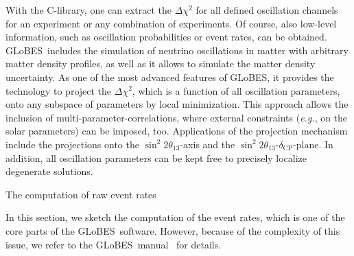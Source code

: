 \documentclass[12pt,a4paper]{article}
\makeatletter
\renewcommand{\section}{\@startsection{section}{1}{0em}{-\baselineskip}%
{\baselineskip}{\normalfont\large\bfseries}}
\newcommand{\eg}{{\it e.g.}}
\newcommand{\deltacp}{\delta_{\mathrm{CP}}}
\newcommand{\stheta}{\sin^2 2 \theta_{13}}
\newcommand{\GLOBES}{{\sf GLoBES}}
\makeatother
\begin{document}
With the C-library, one can extract the $\Delta \chi^2$ for all defined 
oscillation channels for an experiment or any combination of experiments.
Of course, also low-level information, such as oscillation
probabilities or event rates, can be obtained. \GLOBES\ includes the
simulation of neutrino oscillations in matter with arbitrary matter 
density profiles, as well as it allows to simulate the matter density
uncertainty. As one of the most
advanced features of \GLOBES , it provides the technology to 
project the $\Delta \chi^2$, which is a function of all oscillation
parameters, onto any subspace of parameters by local minimization. 
This approach allows the inclusion of multi-parameter-correlations,
where external constraints (\eg, on the solar parameters) can be imposed, too.
Applications of the projection mechanism include the projections onto 
the $\stheta$-axis and the $\stheta$-$\deltacp$-plane. In addition, 
all oscillation parameters can be kept free to precisely localize 
degenerate solutions.

\section{The computation of raw event rates}

In this section, we sketch the computation of 
the event rates, which is one of the core parts of the \GLOBES\
software. However, because of the complexity of this issue,
we refer to the \GLOBES\ manual~\cite{Manual} for
details.  
\end{document}
